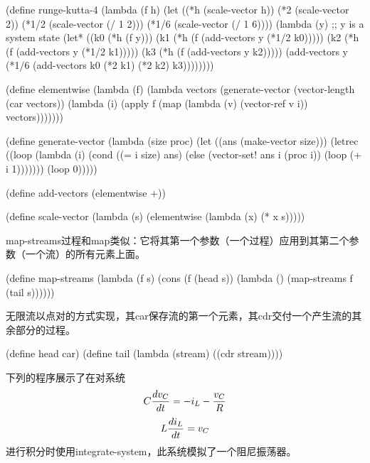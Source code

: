 \begin{schemenoindent}
(define runge-kutta-4
  (lambda (f h)
    (let ((*h (scale-vector h))
          (*2 (scale-vector 2))
          (*1/2 (scale-vector (/ 1 2)))
          (*1/6 (scale-vector (/ 1 6))))
      (lambda (y)
        ;; y {\rm{}is a system state}
        (let* ((k0 (*h (f y)))
               (k1 (*h (f (add-vectors y (*1/2 k0)))))
               (k2 (*h (f (add-vectors y (*1/2 k1)))))
               (k3 (*h (f (add-vectors y k2)))))
          (add-vectors y
            (*1/6 (add-vectors k0
                               (*2 k1)
                               (*2 k2)
                               k3))))))))

(define elementwise
  (lambda (f)
    (lambda vectors
      (generate-vector
        (vector-length (car vectors))
        (lambda (i)
          (apply f
                 (map (lambda (v) (vector-ref  v i))
                      vectors)))))))

(define generate-vector
  (lambda (size proc)
    (let ((ans (make-vector size)))
      (letrec ((loop
                (lambda (i)
                  (cond ((= i size) ans)
                        (else
                         (vector-set! ans i (proc i))
                         (loop (+ i 1)))))))
        (loop 0)))))

(define add-vectors (elementwise +))

(define scale-vector
  (lambda (s)
    (elementwise (lambda (x) (* x s)))))%
\end{schemenoindent}

{\cf map-streams}过程和{\cf map}类似：它将其第一个参数（一个过程）应用到其第二个参数（一个流）的所有元素上面。

\begin{schemenoindent}
(define map-streams
  (lambda (f s)
    (cons (f (head s))
          (lambda () (map-streams f (tail s))))))%
\end{schemenoindent}

无限流以点对的方式实现，其car保存流的第一个元素，其cdr交付一个产生流的其余部分的过程。

\begin{schemenoindent}
(define head car)
(define tail
  (lambda (stream) ((cdr stream))))%
\end{schemenoindent}

\bigskip
下列的程序展示了在对系统
$$ C {dv_C \over dt} = -i_L - {v_C \over R}$$\nobreak
$$ L {di_L \over dt} = v_C$$
进行积分时使用{\cf integrate-\hp{}system}，此系统模拟了一个阻尼振荡器。

